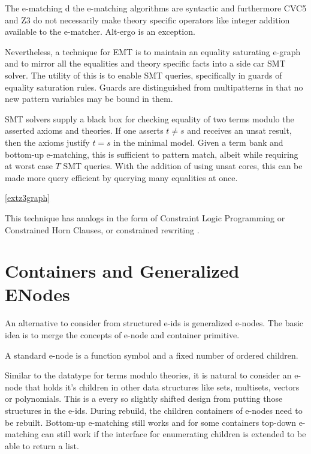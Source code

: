 The e-matching d the e-matching algorithms are syntactic and furthermore CVC5 and Z3 do not necessarily make theory specific operators like integer addition available to the e-matcher.
Alt-ergo is an exception.

Nevertheless, a technique for EMT is to maintain an equality saturating e-graph and to mirror all the equalities and theory specific facts into a side car SMT solver. The utility of this is to enable SMT queries, specifically in guards of equality saturation rules. Guards are distinguished from multipatterns in that no new pattern variables may be bound in them.


SMT solvers supply a black box for checking equality of two terms modulo the asserted axioms and theories. If one asserts $t \ne s$ and receives an unsat result, then the axioms justify $t = s$ in the minimal model. Given a term bank and bottom-up e-matching, this is sufficient to pattern match, albeit while requiring at worst case $T$ SMT queries. With the addition of using unsat cores, this can be made more query efficient by querying many equalities at once.

\ref{extz3graph} 


This technique has analogs in the form of Constraint Logic Programming \cite{JAFFAR1994503} or Constrained Horn Clauses, or constrained rewriting  \cite{constrainedrewrite}.


\section{Containers and Generalized ENodes}

An alternative to consider from structured e-ids is generalized e-nodes. The basic idea is to merge the concepts of e-node and container primitive.

A standard e-node is a function symbol and a fixed number of ordered children.

Similar to the datatype for terms modulo theories, it is natural to consider an e-node that holds it's children in other data structures like sets, multisets, vectors or polynomials. This is a every so slightly shifted design from putting those structures in the e-ids. During rebuild, the children containers of e-nodes need to be rebuilt. Bottom-up e-matching still works and for some containers top-down e-matching can still work if the interface for enumerating children is extended to be able to return a list.

